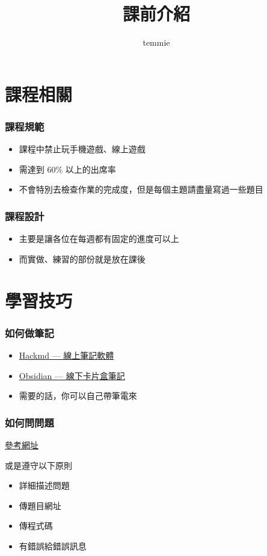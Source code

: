 \documentclass{beamer}
\title{課前介紹}
\author{temmie}
\date{}
\begin{document}
\begin{frame}
    \titlepage
\end{frame}

\begin{frame}
    \tableofcontents
\end{frame}

\section{課程相關}

\begin{frame}
    \frametitle{課程規範}
    \begin{itemize}
        \item 課程中禁止玩手機遊戲、線上遊戲
        \item 需達到 60\% 以上的出席率
        \item 不會特別去檢查作業的完成度，但是每個主題請盡量寫過一些題目
    \end{itemize}
\end{frame}

\begin{frame}
    \frametitle{課程設計}
    \begin{itemize}
        \item 主要是讓各位在每週都有固定的進度可以上
        \item 而實做、練習的部份就是放在課後
    \end{itemize}
\end{frame}

\section{學習技巧}

\begin{frame}
    \frametitle{如何做筆記}
    \begin{itemize}
        \item \href{https://hackmd.io/?nav=overview}{Hackmd — 線上筆記軟體}
        \item \href{https://youtu.be/Egj_DdGUIDI}{Obsidian — 線下卡片盒筆記}
        \vspace{0.5cm}
        \item 需要的話，你可以自己帶筆電來
    \end{itemize}
\end{frame}

\begin{frame}
    \frametitle{如何問問題}
    \href{https://github.com/ryanhanwu/How-To-Ask-Questions-The-Smart-Way}{參考網址}
    
    \vspace{0.5cm}
    或是遵守以下原則
    \begin{itemize}
        \item 詳細描述問題
        \item 傳題目網址
        \item 傳程式碼
        \item 有錯誤給錯誤訊息
    \end{itemize}
\end{frame}
\end{document}
